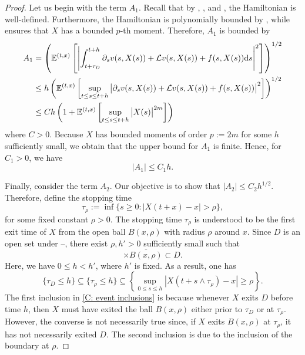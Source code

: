 \begin{proof}
    Let us begin with the term $A_1$. Recall that by , , and , the Hamiltonian is well-defined. Furthermore, the Hamiltonian is polynomially bounded by , while  ensures that $X$ has a bounded $p$-th moment. Therefore, $A_1$ is bounded by
    \begin{align*}
        A_1 &= \left(\mathbb{E}^{(t,x)} \left[ \left| \int_{t+\tau_D}^{t+h} \partial_s v(s, X(s)) + \mathcal{L} v(s,X(s)) + f(s,X(s)) \mathrm{d} s \right|^2 \right]\right)^{1/2} \\
        & \leq h \left(\mathbb{E}^{(t,x)} \left[  \sup_{t \leq s \leq t+h}\big|\partial_s v(s, X(s)) + \mathcal{L} v(s,X(s)) + f(s,X(s))\big|^2 \right]\right)^{1/2} \\
        & \leq C h \left(1+ \mathbb{E}^{(t,x)} \left[\sup_{t \leq s \leq t+h} \big|X(s)\big|^{2m} \right] \right) 
    \end{align*}
    where $C>0$. Because $X$ has bounded moments of order $p:=2m$ for some $h$ sufficiently small, we obtain that the upper bound for $A_1$ is finite. Hence, for $C_1>0$, we have
    \begin{equation}
        |A_1| \leq C_1 h.
        \label{C: A1 upper bound}
    \end{equation}

    Finally, consider the term $A_2$. Our objective is to show that $|A_2| \leq C_2 h^{1/2}$. Therefore, define the stopping time
    \begin{equation*}
        \tau_\rho := \inf\{s\geq 0: |X(t+x)-x|> \rho\},
    \end{equation*}
    for some fixed constant $\rho>0$. The stopping time $\tau_\rho$ is understood to be the first exit time of $X$ from the open ball $B(x,\rho)$ with radius $\rho$ around $x$. Since $D$ is an open set under --, there exist $\rho, h'>0$ sufficiently small such that 
    \begin{equation*}
        [t,t+h'] \times \overline{B(x,\rho)} \subset D.
    \end{equation*}
    Here, we have $0\leq h < h'$, where $h'$ is fixed. As a result, one has
    \begin{equation}
        \{\tau_D \leq h\} \subseteq \{\tau_\rho \leq h\} \subseteq \left\{\sup_{0 \leq s \leq h} |X(t+ s \wedge \tau_\rho ) - x| \geq \rho \right\}.
        \label{C: event inclusions}
    \end{equation}
    The first inclusion in \eqref{C: event inclusions} is because whenever $X$ exits $D$ before time $h$, then $X$ must have exited the ball $B(x,\rho)$ either prior to $\tau_D$ or at $\tau_\rho$. However, the converse is not necessarily true since, if $X$ exits $B(x,\rho)$ at $\tau_\rho$, it has not necessarily exited $D$. The second inclusion is due to the inclusion of the boundary at $\rho$. 


\end{proof}
